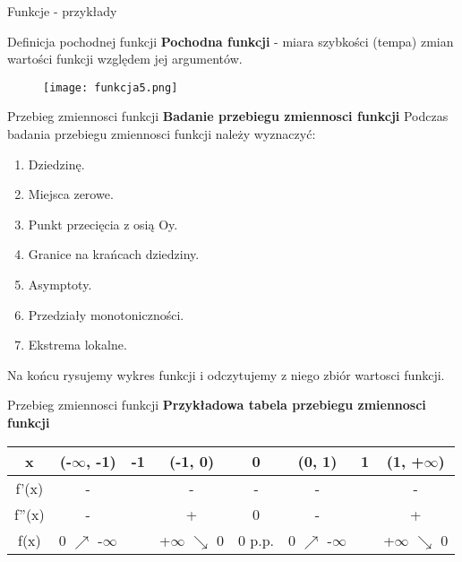 \documentclass{beamer}
\begin{document}
\begin{frame}[t]{Funkcje - przykłady} \vspace{4pt}
\begin{block}{Definicja pochodnej funkcji}
\textbf{Pochodna funkcji} - miara szybkości (tempa) zmian wartości funkcji względem jej argumentów.
\end{block}

\begin{figure}[h!]
\texttt{[image: funkcja5.png]}

\end{figure}

\end{frame}

\begin{frame}[t]{Przebieg zmiennosci funkcji} \vspace{4pt}
\textbf{Badanie przebiegu zmiennosci funkcji}
\newline
Podczas badania przebiegu zmiennosci funkcji należy wyznaczyć:
\begin{enumerate} [1. ]
\item Dziedzinę.
\item Miejsca zerowe.
\item Punkt przecięcia z osią Oy.
\item Granice na krańcach dziedziny.
\item Asymptoty.
\item Przedziały monotoniczności.
\item Ekstrema lokalne.
\end{enumerate}
Na końcu rysujemy wykres funkcji i odczytujemy z niego zbiór wartosci funkcji.
\end{frame}

\begin{frame}[t]{Przebieg zmiennosci funkcji} \vspace{4pt}
\textbf{Przykładowa tabela przebiegu zmiennosci funkcji}
\begin{center}
\begin{tabular}{ | c | c | c | c | c | c | c | c | }
\hline
x & (-$\infty$, -1) & -1 & (-1, 0) & 0 & (0, 1) & 1 & (1, +$\infty$) \\ 
\hline
f'(x) & - &  & - & - & - &  & - \\
\hline
f''(x) & - &  & + & 0 & - &  & + \\
\hline
f(x) & 0 $\nearrow$ -$\infty$ &  & +$\infty$ $\searrow$ 0 & 0 p.p. & 0 $\nearrow$ -$\infty$ &  & +$\infty$ $\searrow$ 0 \\
\hline
\end{tabular}
\end{center}
\end{frame}
\end{document}

